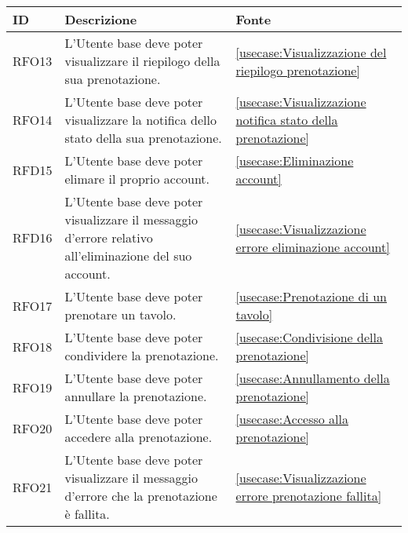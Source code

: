 \begin{table}[H]
	\renewcommand{\arraystretch}{1.5}
	\centering
	\begin{tabularx}{\textwidth}{l|X|p{2cm}}
		\textbf{ID} & \textbf{Descrizione}                                                                                           & \textbf{Fonte}                                                              \\
		\hline
		RFO13       & L'Utente base deve poter visualizzare il riepilogo della sua prenotazione.                                     & \autoref{usecase:Visualizzazione del riepilogo prenotazione}                \\
		\hline
		RFO14       & L'Utente base deve poter visualizzare la notifica dello stato della sua prenotazione.                          & \autoref{usecase:Visualizzazione notifica stato della prenotazione}         \\
		\hline
		RFD15       & L'Utente base deve poter elimare il proprio account.                                                           & \autoref{usecase:Eliminazione account}                                      \\
		\hline
		RFD16       & L'Utente base deve poter visualizzare il messaggio d'errore relativo all'eliminazione del suo account.         & \autoref{usecase:Visualizzazione errore eliminazione account}               \\
		\hline
		RFO17       & L'Utente base deve poter prenotare un tavolo.                                                                  & \autoref{usecase:Prenotazione di un tavolo}                                 \\
		\hline
		RFO18       & L'Utente base deve poter condividere la prenotazione.                                                          & \autoref{usecase:Condivisione della prenotazione}                           \\
		\hline
		RFO19       & L'Utente base deve poter annullare la prenotazione.                                                            & \autoref{usecase:Annullamento della prenotazione}                           \\
		\hline
		RFO20       & L'Utente base deve poter accedere alla prenotazione.                                                           & \autoref{usecase:Accesso alla prenotazione}                                 \\
		\hline
		RFO21       & L'Utente base deve poter visualizzare il messaggio d'errore che la prenotazione è fallita.                     & \autoref{usecase:Visualizzazione errore prenotazione fallita}               \\

\end{tabularx}
\end{table}
